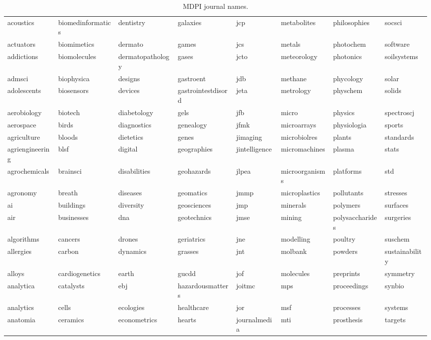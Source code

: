\documentclass[notspecified,article,submit,moreauthors,pdftex]{Definitions/mdpi}
\begin{document}
\startlandscape

\begin{longtable}[t]{llllllll}
\caption{\label{tab:mdpinames}MDPI journal names.}\\
\toprule
acoustics & biomedinformatics & dentistry & galaxies & jcp & metabolites & philosophies & socsci\\
actuators & biomimetics & dermato & games & jcs & metals & photochem & software\\
addictions & biomolecules & dermatopathology & gases & jcto & meteorology & photonics & soilsystems\\
admsci & biophysica & designs & gastroent & jdb & methane & phycology & solar\\
adolescents & biosensors & devices & gastrointestdisord & jeta & metrology & physchem & solids\\
\addlinespace
aerobiology & biotech & diabetology & gels & jfb & micro & physics & spectroscj\\
aerospace & birds & diagnostics & genealogy & jfmk & microarrays & physiologia & sports\\
agriculture & bloods & dietetics & genes & jimaging & microbiolres & plants & standards\\
agriengineering & blsf & digital & geographies & jintelligence & micromachines & plasma & stats\\
agrochemicals & brainsci & disabilities & geohazards & jlpea & microorganisms & platforms & std\\
\addlinespace
agronomy & breath & diseases & geomatics & jmmp & microplastics & pollutants & stresses\\
ai & buildings & diversity & geosciences & jmp & minerals & polymers & surfaces\\
air & businesses & dna & geotechnics & jmse & mining & polysaccharides & surgeries\\
algorithms & cancers & drones & geriatrics & jne & modelling & poultry & suschem\\
allergies & carbon & dynamics & grasses & jnt & molbank & powders & sustainability\\
\addlinespace
alloys & cardiogenetics & earth & gucdd & jof & molecules & preprints & symmetry\\
analytica & catalysts & ebj & hazardousmatters & joitmc & mps & proceedings & synbio\\
analytics & cells & ecologies & healthcare & jor & msf & processes & systems\\
anatomia & ceramics & econometrics & hearts & journalmedia & mti & prosthesis & targets\\

\end{longtable}
\end{document}
